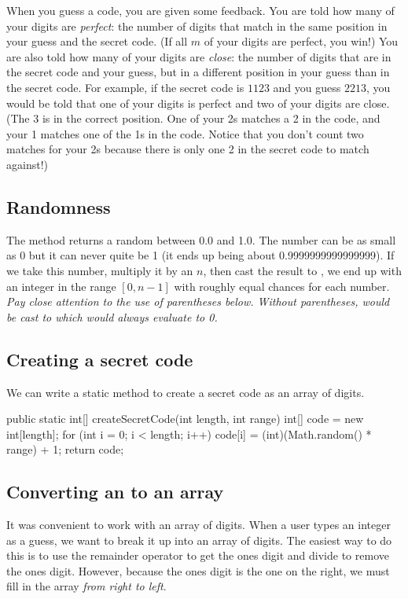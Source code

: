 When you guess a code, you are given some feedback. You are told how many of your digits are {\em perfect}: the number of digits that match in the same position in your guess and the secret code. (If all $m$ of your digits are perfect, you win!) You are also told how many of your digits are {\em close}: the number of digits that are in the secret code and your guess, but in a different position in your guess than in the secret code.
For example, if the secret code is $1123$ and you guess $2213$, you would be told that one of your digits is perfect and two of your digits are close. (The 3 is in the correct position. One of your 2s matches a 2 in the code, and your 1 matches one of the 1s in the code. Notice that you don't count two matches for your 2s because there is only one 2 in the secret code to match against!)

\subsection{Randomness}
\label{randomness}
The  method returns a random  between 0.0 and 1.0. The number can be as small as 0 but it can never quite be 1 (it ends up being about 0.9999999999999999). If we take this number, multiply it by an  $n$, then cast the result to , we end up with an integer in the range $[0,n-1]$ with roughly equal chances for each number. {\em Pay close attention to the use of parentheses below. Without parentheses,  would be cast to  which would always evaluate to 0.}


\subsection{Creating a secret code}

We can write a static method to create a secret code as an array of digits.
\begin{code}
public static int[] createSecretCode(int length, int range) {
	int[] code = new int[length];
	for (int i = 0; i < length; i++) {
		code[i] = (int)(Math.random() * range) + 1;
	}
	return code;
}
\end{code}

\subsection{Converting an  to an array}

It was convenient to work with an array of digits. When a user types an integer as a guess, we want to break it up into an array of digits. The easiest way to do this is to use the remainder operator \java{\%} to get the ones digit and divide to remove the ones digit. However, because the ones digit is the one on the right, we must fill in the array {\em from right to left}.

